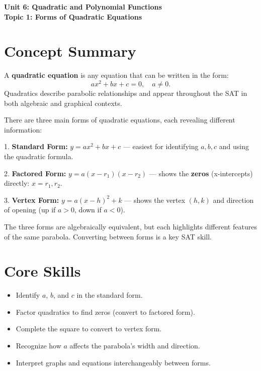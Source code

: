 \documentclass[14pt]{extarticle}
\begin{document}
\raggedright
{}

\begin{center}
    \LARGE \textbf{Unit 6: Quadratic and Polynomial Functions} \\[6pt]
    \Large \textbf{Topic 1: Forms of Quadratic Equations}
\end{center}

\vspace{1em}

\section*{Concept Summary}

A \textbf{quadratic equation} is any equation that can be written in the form:
\[
ax^2 + bx + c = 0, \quad a \ne 0.
\]
Quadratics describe parabolic relationships and appear throughout the SAT in both algebraic and graphical contexts.

There are three main forms of quadratic equations, each revealing different information:

1. \textbf{Standard Form:} \(y = ax^2 + bx + c\)  
   — easiest for identifying \(a, b, c\) and using the quadratic formula.

2. \textbf{Factored Form:} \(y = a(x - r_1)(x - r_2)\)  
   — shows the \textbf{zeros} (x-intercepts) directly: \(x = r_1, r_2.\)

3. \textbf{Vertex Form:} \(y = a(x - h)^2 + k\)  
   — shows the vertex \((h, k)\) and direction of opening (up if \(a > 0\), down if \(a < 0\)).

The three forms are algebraically equivalent, but each highlights different features of the same parabola. Converting between forms is a key SAT skill.

\section*{Core Skills}
\begin{itemize}
  \item Identify \(a\), \(b\), and \(c\) in the standard form.
  \item Factor quadratics to find zeros (convert to factored form).
  \item Complete the square to convert to vertex form.
  \item Recognize how \(a\) affects the parabola’s width and direction.
  \item Interpret graphs and equations interchangeably between forms.
\end{itemize}
\end{document}
